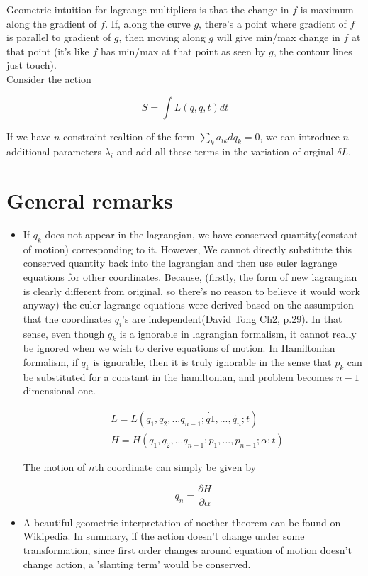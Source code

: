 \documentclass{report}
\begin{document}
\noindent Geometric intuition for lagrange multipliers is that the change in $f$ is maximum along the gradient of $f$. If, along the curve $g$, there's a point where gradient of $f$ is parallel to gradient of $g$, then moving along $g$ will give min/max change in $f$ at that point (it's like $f$ has min/max at that point as seen by $g$, the contour lines just touch).\\

\noindent Consider the action 

$$S = \int L(q,\dot{q},t) dt$$

\noindent If we have $n$ constraint realtion of the form $\sum_{k}a_{ik} dq_k = 0$, we can introduce $n$ additional parameters $\lambda_i$ and add all these terms in the variation of orginal $\delta L$.

\section{General remarks}

\begin{itemize}
  \item If $q_k$ does not appear in the lagrangian, we have conserved quantity(constant of motion) corresponding to it. However, We cannot directly substitute this conserved quantity back into the lagrangian and then use euler lagrange equations for other coordinates. Because, (firstly, the form of new lagrangian is clearly different from original, so there's no reason to believe it would work anyway) the euler-lagrange equations were derived based on the assumption that the coordinates $q_i$'s are independent(David Tong Ch2, p.29). In that sense, even though $q_k$ is a ignorable in lagrangian formalism, it cannot really be ignored when we wish to derive equations of motion. In Hamiltonian formalism, if $q_k$ is ignorable, then it is truly ignorable in the sense that $p_k$ can be substituted for a constant in the hamiltonian, and problem becomes $n-1$ dimensional one.

\begin{align}
&L = L(q_1,q_2,...q_{n-1};\dot{q1},...,\dot{q_n};t)\\
&H = H(q_1,q_2,...q_{n-1}; p_1,...,p_{n-1};\alpha;t)
\end{align}

The motion of $n$th coordinate can simply be given by 

$$\dot{q_n} = \frac{\partial H}{\partial\alpha}$$

  \item A beautiful geometric interpretation of noether theorem can be found on Wikipedia. In summary, if the action doesn't change under some transformation, since first order changes around equation of motion doesn't change action, a 'slanting term' would be conserved.
\end{itemize}
\end{document}
